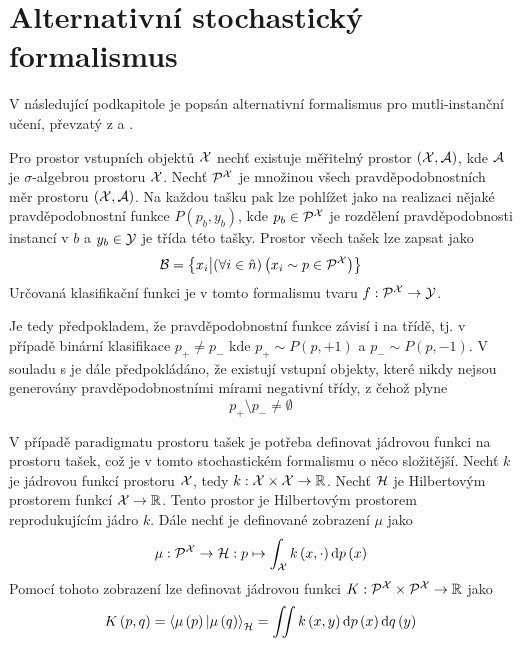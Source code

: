 \section{Alternativní stochastický formalismus}
V následující podkapitole je popsán alternativní formalismus pro mutli-instanční učení, převzatý z \cite{muandet_learning_2012} a \cite{pevny_using_2016}.

Pro prostor vstupních objektů \( \mathcal X \) nechť existuje měřitelný prostor \( \left( \mathcal X, \mathcal A \right) \), kde \( \mathcal A \) je \( \sigma \)-algebrou prostoru \( \mathcal X \). Nechť \( \mathcal P^{\mathcal X} \) je množinou všech pravděpodobnostních měr prostoru \( \left( \mathcal X, \mathcal A \right) \). Na každou tašku pak lze pohlížet jako na realizaci nějaké pravděpodobnostní funkce \( P \left( p_b, y_b \right) \), kde \( p_b \in \mathcal P^{\mathcal X} \) je rozdělení pravděpodobnosti instancí v \( b \) a \( y_b \in \mathcal Y \) je třída této tašky. Prostor všech tašek lze zapsat jako
\[ \mathcal B = \left\{ x_i \middle| \left( \forall i \in \hat n \right) \left( x_i \sim p \in \mathcal P^{\mathcal X} \right) \right\} \]
Určovaná klasifikační funkci je v tomto formalismu tvaru \( f : \mathcal P^{\mathcal X} \to \mathcal Y \).

Je tedy předpokladem, že pravděpodobnostní funkce závisí i na třídě, tj. v případě binární klasifikace \( p_+ \neq p_- \) kde \( p_+ \sim P(p, +1) \) a \( p_- \sim P(p, -1) \). V souladu s \cite{dietterich_solving_1997} je dále předpokládáno, že existují vstupní objekty, které nikdy nejsou generovány pravděpodobnostními mírami negativní třídy, z čehož plyne
\[ p_+ \setminus p_- \neq \emptyset \]

V případě paradigmatu prostoru tašek je potřeba definovat jádrovou funkci na prostoru tašek, což je v tomto stochastickém formalismu o něco složitější. Nechť \( k \) je jádrovou funkcí prostoru \( \mathcal X \), tedy \( k : \mathcal X \times \mathcal X \to \mathbb R \). Nechť \( \mathcal H \) je Hilbertovým prostorem funkcí \( \mathcal X \to \mathbb R \). Tento prostor je Hilbertovým prostorem reprodukujícím jádro \( k \). Dále nechť je definované zobrazení \( \mu \) jako
\[ \mu : \mathcal P^{\mathcal X} \to \mathcal H : p \mapsto \int_{\mathcal X} k \left( x, \cdot \right) \mathrm{d}p \left( x \right) \]
Pomocí tohoto zobrazení lze definovat jádrovou funkci \( K : \mathcal P^{\mathcal X} \times \mathcal P^{\mathcal X} \to \mathbb R \) jako
\[ K \left( p, q \right) = \braket{\mu \left( p \right) | \mu \left( q \right)}_{\mathcal H} = \iint k \left( x, y \right) \mathrm{d} p \left( x \right) \mathrm{d} q \left( y \right) \]


